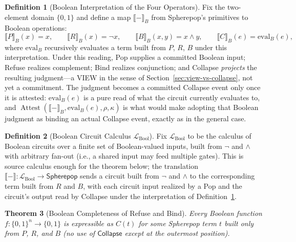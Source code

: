 \documentclass[12pt, a4paper, openany]{book}
\theoremstyle{plain}
\newtheorem{theorem}{Theorem}[chapter]
\theoremstyle{definition}
\newtheorem{definition}[theorem]{Definition}
\theoremstyle{remark}
\newcommand{\Collapse}{\mathsf{Collapse}}
\begin{document}
\begin{definition}[Boolean Interpretation of the Four Operators]
\label{def:boolean-interpretation}
Fix the two-element domain $\{0, 1\}$ and define a map $\llbracket - \rrbracket_B$
from Spherepop's primitives to Boolean operations:
\[
\llbracket P \rrbracket_B(x) = x, \qquad
\llbracket R \rrbracket_B(x) = \neg x, \qquad
\llbracket B \rrbracket_B(x, y) = x \wedge y, \qquad
\llbracket C \rrbracket_B(e) = \mathrm{eval}_B(e),
\]
where $\mathrm{eval}_B$ recursively evaluates a term built from $P$, $R$, $B$
under this interpretation. Under this reading, Pop supplies a committed
Boolean input; Refuse realizes complement; Bind realizes conjunction; and
Collapse \emph{projects} the resulting judgment---a VIEW in the sense of
Section~\ref{sec:view-vs-collapse}, not yet a commitment. The judgment becomes
a committed Collapse event only once it is attested: $\mathrm{eval}_B(e)$ is a
pure read of what the circuit currently evaluates to, and
$\operatorname{Attest}(\llbracket - \rrbracket_B, \mathrm{eval}_B(e), \rho, \kappa)$
is what would make adopting that Boolean judgment as binding an actual
Collapse event, exactly as in the general case.
\end{definition}

\begin{definition}[Boolean Circuit Calculus $\mathcal{L}_{\mathrm{Bool}}$]
Fix $\mathcal{L}_{\mathrm{Bool}}$ to be the calculus of Boolean circuits over a
finite set of Boolean-valued inputs, built from $\neg$ and $\wedge$ with
arbitrary fan-out (i.e., a shared input may feed multiple gates). This is
source calculus enough for the theorem below; the translation
$\llbracket - \rrbracket : \mathcal{L}_{\mathrm{Bool}} \to \mathsf{Spherepop}$
sends a circuit built from $\neg$ and $\wedge$ to the corresponding term built
from $R$ and $B$, with each circuit input realized by a Pop and the circuit's
output read by Collapse under the interpretation of
Definition~\ref{def:boolean-interpretation}.
\end{definition}

\begin{theorem}[Boolean Completeness of Refuse and Bind]
\label{thm:boolean-completeness}
Every Boolean function $f : \{0,1\}^n \to \{0,1\}$ is expressible as
$C(t)$ for some Spherepop term $t$ built only from $P$, $R$, and $B$ (no use of
$\Collapse$ except at the outermost position).
\end{theorem}
\end{document}
